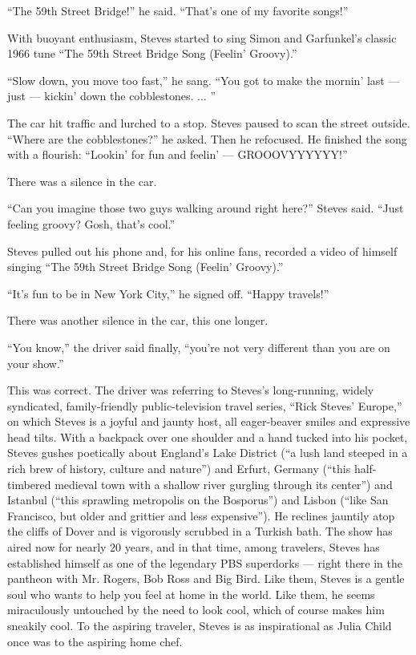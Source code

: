 ``The 59th Street Bridge!'' he said. ``That's one of my favorite
songs!''

With buoyant enthusiasm, Steves started to sing Simon and Garfunkel's
classic 1966 tune ``The 59th Street Bridge Song (Feelin' Groovy).''

``Slow down, you move too fast,'' he sang. ``You got to make the mornin'
last --- just --- kickin' down the cobblestones. ... ''

The car hit traffic and lurched to a stop. Steves paused to scan the
street outside. ``Where are the cobblestones?'' he asked. Then he
refocused. He finished the song with a flourish: ``Lookin' for fun and
feelin' --- GROOOVYYYYYY!''

There was a silence in the car.

``Can you imagine those two guys walking around right here?'' Steves
said. ``Just feeling groovy? Gosh, that's cool.''

Steves pulled out his phone and, for his online fans, recorded a video
of himself singing ``The 59th Street Bridge Song (Feelin' Groovy).''

``It's fun to be in New York City,'' he signed off. ``Happy travels!''

There was another silence in the car, this one longer.

``You know,'' the driver said finally, ``you're not very different than
you are on your show.''

This was correct. The driver was referring to Steves's long-running,
widely syndicated, family-friendly public-television travel series,
``Rick Steves' Europe,'' on which Steves is a joyful and jaunty host,
all eager-beaver smiles and expressive head tilts. With a backpack over
one shoulder and a hand tucked into his pocket, Steves gushes poetically
about England's Lake District (``a lush land steeped in a rich brew of
history, culture and nature'') and Erfurt, Germany (``this half-timbered
medieval town with a shallow river gurgling through its center'') and
Istanbul (``this sprawling metropolis on the Bosporus'') and Lisbon
(``like San Francisco, but older and grittier and less expensive''). He
reclines jauntily atop the cliffs of Dover and is vigorously scrubbed in
a Turkish bath. The show has aired now for nearly 20 years, and in that
time, among travelers, Steves has established himself as one of the
legendary PBS superdorks --- right there in the pantheon with Mr.
Rogers, Bob Ross and Big Bird. Like them, Steves is a gentle soul who
wants to help you feel at home in the world. Like them, he seems
miraculously untouched by the need to look cool, which of course makes
him sneakily cool. To the aspiring traveler, Steves is as inspirational
as Julia Child once was to the aspiring home chef.

